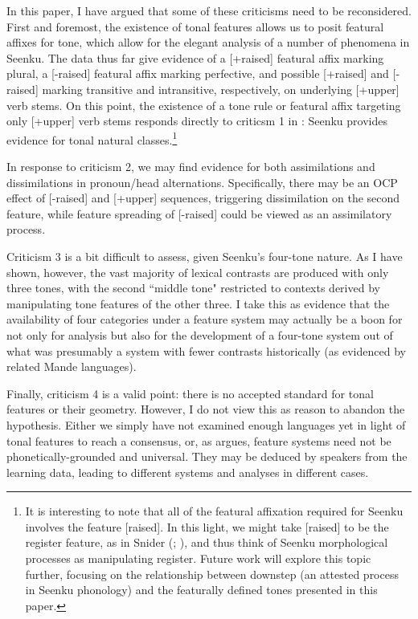 \documentclass[output=paper]{langsci/langscibook}
\begin{document}
In this paper, I have argued that some of these criticisms need to be reconsidered. First and foremost, the existence of tonal features allows us to posit featural affixes for tone, which allow for the elegant analysis of a number of phenomena in Seenku. The data thus far give evidence of a {[+raised]} featural affix marking plural, a {[-raised]} featural affix marking perfective, and possible [+raised] and [-raised] marking transitive and intransitive, respectively, on underlying [+upper] verb stems. On this point, the existence of a tone rule or featural affix targeting only [+upper] verb stems responds directly to criticsm 1 in : Seenku provides evidence for tonal natural classes.\footnote{It is interesting to note that all of the featural affixation required for Seenku involves the feature [raised]. In this light, we might take [raised] to be the register feature, as in Snider (\citeyear{Snider90}; \citeyear{Snider98}), and thus think of Seenku morphological processes as manipulating register. Future work will explore this topic further, focusing on the relationship between downstep (an attested process in Seenku phonology) and the featurally defined tones presented in this paper.}

In response to criticism 2, we may find evidence for both assimilations and dissimilations in pronoun/head alternations. Specifically, there may be an OCP effect of [-raised] and [+upper] sequences, triggering dissimilation on the second feature, while feature spreading of [-raised] could be viewed as an assimilatory process.

Criticism 3 is a bit difficult to assess, given Seenku's four-tone nature. As I have shown, however, the vast majority of lexical contrasts are produced with only three tones, with the second ``middle tone" restricted to contexts derived by manipulating tone features of the other three. I take this as evidence that the availability of four categories under a feature system may actually be a boon for not only for analysis but also for the development of a four-tone system out of what was presumably a system with fewer contrasts historically (as evidenced by related Mande languages).

Finally, criticism 4 is a valid point: there is no accepted standard for tonal features or their geometry. However, I do not view this as reason to abandon the hypothesis. Either we simply have not examined enough languages yet in light of tonal features to reach a consensus, or, as \citet{Odden10} argues, feature systems need not be phonetically-grounded and universal. They may be deduced by speakers from the learning data, leading to different systems and analyses in different cases. 
\end{document}
